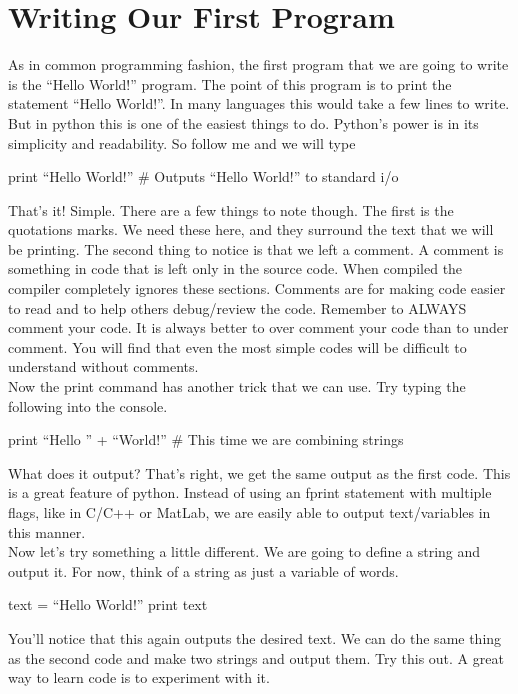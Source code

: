 \documentclass[11pt]{article}   %
\begin{document}
\section*{Writing Our First Program}
As in common programming fashion, the first program that we are going to write is the ``Hello World!'' program.  The point of this program is to print the statement ``Hello World!''.
In many languages this would take a few lines to write.  But in python this is one of the easiest things to do.  Python's power is in its simplicity and readability.  So follow me and 
we will type
\begin{tcolorbox}
   print ``Hello World!''   $\#$ Outputs ``Hello World!'' to standard i/o
\end{tcolorbox}
That's it!  Simple.  There are a few things to note though.  The first is the quotations marks.  We need these here, and they surround the text that we will be printing.  The second thing
to notice is that we left a comment.  A comment is something in code that is left only in the source code.  When compiled the compiler completely ignores these sections.  Comments are for
making code easier to read and to help others debug/review the code.  Remember to ALWAYS comment your code.  It is always better to over comment your code than to under comment.
You will find that even the most simple codes will be difficult to understand without comments.  
\\
Now the print command has another trick that we can use.  Try typing the following into the console.
\begin{tcolorbox}
   print ``Hello '' + ``World!'' $\#$ This time we are combining strings
\end{tcolorbox}
What does it output?  That's right, we get the same output as the first code.  This is a great feature of python.  Instead of using an fprint statement with multiple flags, like in C/C++ or
MatLab, we are easily able to output text/variables in this manner.
\\
Now let's try something a little different.  We are going to define a string and output it.  For now, think of a string as just a variable of words.\\
\begin{tcolorbox}
   text = ``Hello World!''
   print text
\end{tcolorbox}
You'll notice that this again outputs the desired text.  We can do the same thing as the second code and make two strings and output them.  Try this out.  A great way to learn code is to
experiment with it.  
\end{document}
